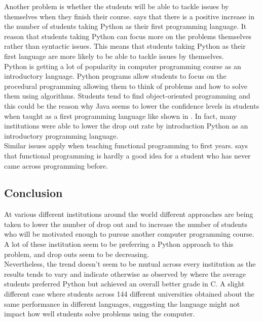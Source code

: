 \documentclass[a4paper]{article}
\begin{document}
Another problem is whether the students will be able to tackle issues by themselves when they finish their course. \textcite{JayalLauriaTuckerSwift2011} says that there is a positive increase in the number of students taking Python as their first programming language. It reason that students taking Python can focus more on the problems themselves rather than syntactic issues. This means that students taking Python as their first language are more likely to be able to tackle issues by themselves.\\

Python is getting a lot of popularity in computer programming course as an introductory language. \parencite{Yadin2011} Python programs allow students to focus on the procedural programming allowing them to think of problems and how to solve them using algorithms. Students tend to find object-oriented programming and this could be the reason why Java seems to lower the confidence levels in students when taught as a first programming language like shown in \textcite{Daly2011}. In fact, many institutions were able to lower the drop out rate by introduction Python as an introductory programming language. \parencite{NikulaSajaniemiTedreWray2007}\\

Similar issues apply when teaching functional programming to first years. \textcite{ChakravartyKeller2004} says that functional programming is hardly a good idea for a student who has never came across programming before. 

\subsection{Conclusion}
At various different institutions around the world different approaches are being taken to lower the number of drop out and to increase the number of students who will be motivated enough to pursue another computer programming course. A lot of these institution seem to be preferring a Python approach to this problem, and drop outs seem to be decreasing. \parencite{JayalLauriaTuckerSwift2011}\\

Nevertheless, the trend doesn't seem to be mutual across every institution as the results tends to vary and indicate otherwise as observed by \textcite{KrpanBilobrk2011} where the average students preferred Python but achieved an overall better grade in C. A slight different case where students across 144 different universities obtained about the same performance in different languages, suggesting the language might not impact how well students solve problems using the computer. \parencite{WatsonLi2014}\\
\end{document}
